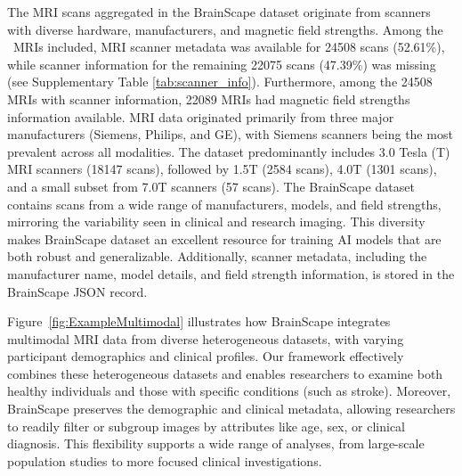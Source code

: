 The MRI scans aggregated in the BrainScape dataset originate from scanners with diverse hardware, manufacturers, and magnetic field strengths.
Among the \TotalNumMRIs\ MRIs included, MRI scanner metadata was available for 24508 scans (52.61\%), 
while scanner information for the remaining 22075 scans (47.39\%) was missing (see Supplementary Table \ref{tab:scanner_info}). 
Furthermore, among the 24508 MRIs with scanner information, 22089 MRIs had magnetic field strengths information available.
MRI data originated primarily from three major manufacturers (Siemens, Philips, and GE), 
with Siemens scanners being the most prevalent across all modalities. 
The dataset predominantly includes 3.0 Tesla (T) MRI scanners (18147 scans), followed by 1.5T (2584 scans), 
4.0T (1301 scans), and a small subset from 7.0T scanners (57 scans). 
The BrainScape dataset contains scans from a wide range of manufacturers, models, and field strengths, 
mirroring the variability seen in clinical and research imaging. 
This diversity makes BrainScape dataset an excellent resource for training AI models that are both robust and generalizable.
Additionally, scanner metadata, including the manufacturer name, model details, and field strength information, is stored in the BrainScape JSON record.

Figure~\ref{fig:ExampleMultimodal} illustrates how BrainScape integrates multimodal MRI data 
from diverse heterogeneous datasets, with varying participant demographics and clinical profiles. 
Our framework effectively combines these heterogeneous datasets and enables researchers 
to examine both healthy individuals and those with specific conditions (such as stroke). 
Moreover, BrainScape preserves the demographic and clinical metadata, allowing researchers 
to readily filter or subgroup images by attributes like age, sex, or clinical diagnosis. 
This flexibility supports a wide range of analyses, from large-scale population studies 
to more focused clinical investigations.

